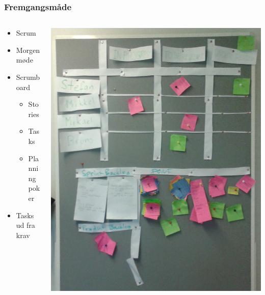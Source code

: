 \begin{frame}
\frametitle{Fremgangsmåde}

\begin{columns}

\begin{column}{.48\textwidth}
\begin{itemize}
\item Scrum
\item Morgenmøde
\item Scrumboard
\begin{itemize}
\item Stories
\item Tasks
\item Planning poker
\end{itemize}
\item Tasks ud fra krav
\end{itemize}
\end{column}

\begin{column}{.48\textwidth}
\includegraphics[width=\textwidth]{pgraphics/scrumboard}
\end{column}

\end{columns}

\end{frame}
